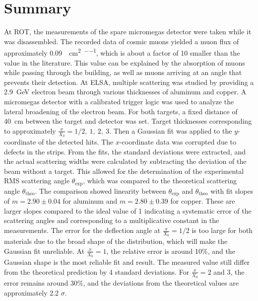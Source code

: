 \documentclass[sn-mathphys-num,iicol]{sn-jnl}
\theoremstyle{thmstyleone}
\theoremstyle{thmstyletwo}
\theoremstyle{thmstylethree}
\begin{document}

\section{Summary}
At ROT, the measurements of the spare micromegas detector were taken while it was disassembled.
The recorded data of cosmic muons yielded a muon flux of approximately \SI{0.09}{\per\centi\meter\squared\per\min}, which is about a factor of 10 smaller than the value in the literature. 
This value can be explained by the absorption of muons while passing through the building, as well as muons arriving at an angle that prevents their detection.
At ELSA, multiple scattering was studied by providing a \SI{2.9}{GeV} electron beam through various thicknesses of aluminum and copper. 
A micromegas detector with a calibrated trigger logic was used to analyze the lateral broadening of the electron beam. 
For both targets, a fixed distance of \SI{40}{\centi\meter} between the target and detector was set. 
Target thicknesses corresponding to approximately $\tfrac{x}{X_0} = 1/2,\ 1,\ 2,\ 3$. Then a Gaussian fit was applied to the $y$-coordinate of the detected hits. 
The $x$-coordinate data was corrupted due to defects in the strips.
From the fits, the standard deviations were extracted, and the actual scattering widths were calculated by subtracting the deviation of the beam without a target. 
This allowed for the determination of the experimental RMS scattering angle $\theta_{\text{exp}}$, which was compared to the theoretical scattering angle $\theta_{\text{theo}}$.
The comparison showed linearity between $\theta_{\text{exp}}$ and $\theta_{\text{theo}}$ with fit slopes of $m = 2.90 \pm 0.04$ for aluminum and $m = 2.80 \pm 0.39$ for copper. 
These are larger slopes compared to the ideal value of 1 indicating a systematic error of the scattering angles and corresponding to a multiplicative constant in the measurements.
The error for the deflection angle at $\tfrac{x}{X_0}=1/2$ is too large for both materials due to the broad shape of the distribution, which will make the Gaussian fit unreliable. 
At $\tfrac{x}{X_0} = 1$, the relative error is around 10\%, and the Gaussian shape is the most reliable fit and result. 
The measured value still differ from the theoretical prediction by 4 standard deviations. For $\tfrac{x}{X_0} = 2$ and 3, the error remains around 30\%, and the deviations from the theoretical values are approximately 2.2 $\sigma$. 
\end{document}
